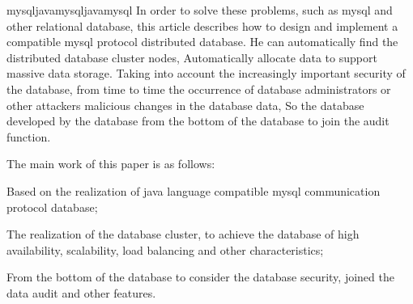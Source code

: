 \begin{Eabstract}{mysql}{java}{mysql}{java}{mysql}
In order to solve these problems, such as mysql and other relational database, this article describes how to design and implement a compatible mysql protocol distributed database. He can automatically find the distributed database cluster nodes,
Automatically allocate data to support massive data storage. Taking into account the increasingly important security of the database, from time to time the occurrence of database administrators or other attackers malicious changes in the database data,
So the database developed by the database from the bottom of the database to join the audit function.

The main work of this paper is as follows:

Based on the realization of java language compatible mysql communication protocol database;

The realization of the database cluster, to achieve the database of high availability, scalability, load balancing and other characteristics;

From the bottom of the database to consider the database security, joined the data audit and other features.
\end{Eabstract}
